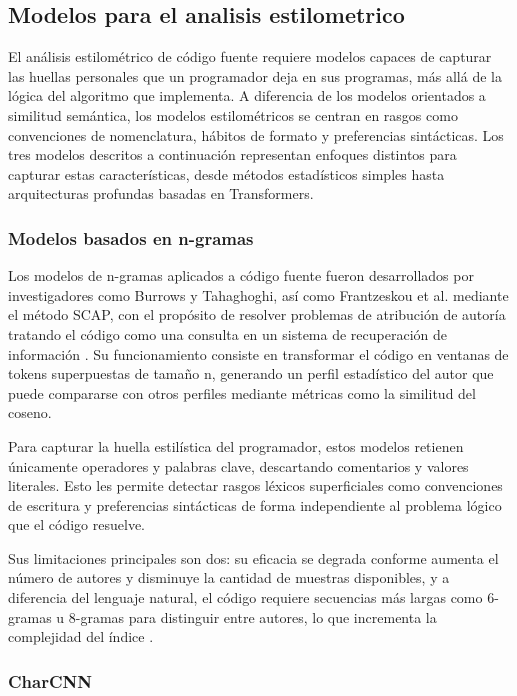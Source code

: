 \subsection{Modelos para el analisis estilometrico}

El análisis estilométrico de código fuente requiere modelos capaces de capturar 
las huellas personales que un programador deja en sus programas, más allá de la 
lógica del algoritmo que implementa. A diferencia de los modelos orientados a 
similitud semántica, los modelos estilométricos se centran en rasgos como 
convenciones de nomenclatura, hábitos de formato y preferencias sintácticas. 
Los tres modelos descritos a continuación representan enfoques distintos para 
capturar estas características, desde métodos estadísticos simples hasta 
arquitecturas profundas basadas en Transformers.

\subsubsection{Modelos basados en n-gramas}

Los modelos de n-gramas aplicados a código fuente fueron desarrollados por 
investigadores como Burrows y Tahaghoghi, así como Frantzeskou et al. mediante 
el método SCAP, con el propósito de resolver problemas de atribución de autoría 
tratando el código como una consulta en un sistema de recuperación de información 
\cite{Burrows2007Ngrams}. Su funcionamiento consiste en transformar el código en 
ventanas de tokens superpuestas de tamaño n, generando un perfil estadístico del 
autor que puede compararse con otros perfiles mediante métricas como la similitud 
del coseno.

Para capturar la huella estilística del programador, estos modelos retienen 
únicamente operadores y palabras clave, descartando comentarios y valores 
literales. Esto les permite detectar rasgos léxicos superficiales como 
convenciones de escritura y preferencias sintácticas de forma independiente 
al problema lógico que el código resuelve.

Sus limitaciones principales son dos: su eficacia se degrada conforme aumenta 
el número de autores y disminuye la cantidad de muestras disponibles, y a 
diferencia del lenguaje natural, el código requiere secuencias más largas 
como 6-gramas u 8-gramas para distinguir entre autores, lo que incrementa 
la complejidad del índice \cite{Burrows2007Ngrams}.

\subsubsection{CharCNN}

